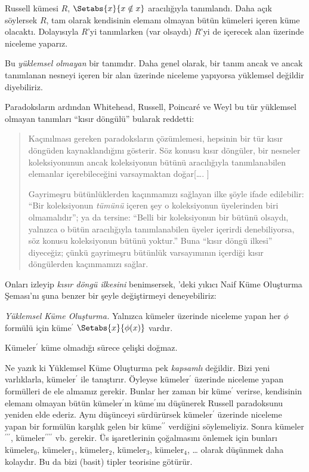 \documentclass[../../../include/open-logic-section]{subfiles}
\begin{document}


Russell kümesi $R$, $\Setabs{x}{x\notin x}$ aracılığıyla tanımlandı. Daha
açık söylersek $R$, tam olarak kendisinin elemanı olmayan bütün kümeleri
içeren küme olacaktı. Dolayısıyla $R$'yi tanımlarken (var olsaydı) $R$'yi de
içerecek alan üzerinde niceleme yaparız.

Bu \emph{yüklemsel olmayan} bir tanımdır. Daha genel olarak, bir tanım ancak
ve ancak tanımlanan nesneyi içeren bir alan üzerinde niceleme yapıyorsa
yüklemsel değildir diyebiliriz.

Paradoksların ardından Whitehead, Russell, Poincar\'{e} ve Weyl bu tür
yüklemsel olmayan tanımları ``kısır döngülü'' bularak reddetti:
\begin{quote}
  Kaçınılması gereken paradoksların çözümlemesi, hepsinin bir tür kısır
  döngüden kaynaklandığını gösterir. Söz konusu kısır döngüler, bir nesneler
  koleksiyonunun ancak koleksiyonun bütünü aracılığıyla tanımlanabilen
  elemanlar içerebileceğini varsaymaktan doğar[\ldots. \textparagraph]

  Gayrimeşru bütünlüklerden kaçınmamızı sağlayan ilke şöyle ifade edilebilir:
  ``Bir koleksiyonun \emph{tümünü} içeren şey o koleksiyonun üyelerinden biri
  olmamalıdır''; ya da tersine: ``Belli bir koleksiyonun bir bütünü olsaydı,
  yalnızca o bütün aracılığıyla tanımlanabilen üyeler içerirdi denebiliyorsa,
  söz konusu koleksiyonun bütünü yoktur.'' Buna ``kısır döngü ilkesi''
  diyeceğiz; çünkü gayrimeşru bütünlük varsayımının içerdiği kısır
  döngülerden kaçınmamızı sağlar. \citep[p.~37]{WhiteheadRussell1910}
\end{quote}
Onları izleyip \emph{kısır döngü ilkesini} benimsersek,
'deki yıkıcı Naif Küme Oluşturma Şeması'nı
şuna benzer bir şeyle değiştirmeyi deneyebiliriz:

\begin{defish}
\emph{Yüklemsel Küme Oluşturma.} Yalnızca kümeler üzerinde niceleme yapan
her $\phi$ formülü için küme$^\prime$ $\Setabs{x}{\phi(x)}$ vardır.
\end{defish}

Kümeler$^{\prime}$ küme olmadığı sürece çelişki doğmaz.

Ne yazık ki Yüklemsel Küme Oluşturma pek \emph{kapsamlı} değildir. Bizi yeni
varlıklarla, kümeler$^\prime$ ile tanıştırır. Öyleyse kümeler$^\prime$
üzerinde niceleme yapan formülleri de ele almamız gerekir. Bunlar her zaman
bir küme$^\prime$ verirse, kendisinin elemanı olmayan bütün
kümeler$^\prime$ın küme$^\prime$ını düşünerek Russell paradoksunu yeniden
elde ederiz. Aynı düşünceyi sürdürürsek kümeler$^\prime$ üzerinde niceleme
yapan bir formülün karşılık gelen bir küme$^{\prime\prime}$ verdiğini
söylemeliyiz. Sonra kümeler$^{\prime\prime\prime}$,
kümeler$^{\prime\prime\prime\prime}$ vb. gerekir. Üs işaretlerinin
çoğalmasını önlemek için bunları kümeler$_0$, kümeler$_1$, kümeler$_2$,
kümeler$_3$, kümeler$_4$, \ldots{} olarak düşünmek daha kolaydır. Bu da bizi
(basit) tipler teorisine götürür.
\end{document}
